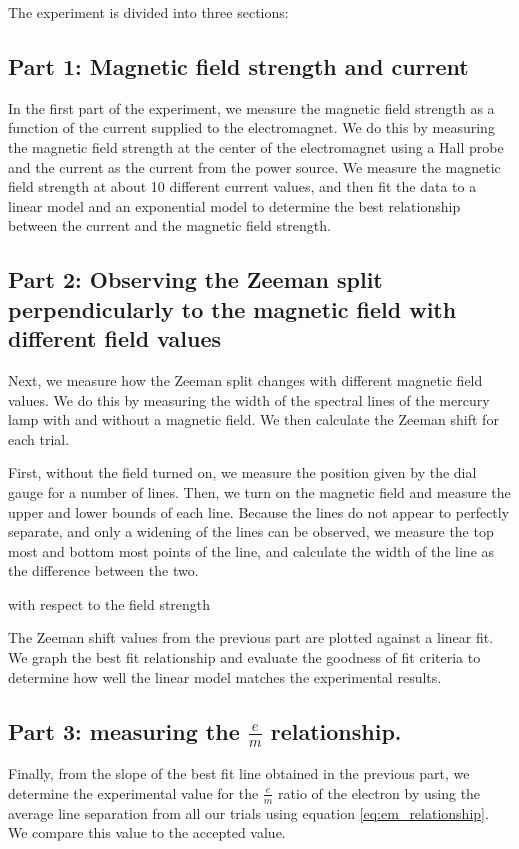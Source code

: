 The experiment is divided into three sections:

\subsection{Part 1: Magnetic field strength and current}
In the first part of the experiment, we measure the magnetic field strength as a function of the current supplied to the electromagnet. We do this by measuring the magnetic field strength at the center of the electromagnet using a Hall probe and the current as the current from the power source. We measure the magnetic field strength at about 10 different current values, and then fit the data to a linear model and an exponential model to determine the best relationship between the current and the magnetic field strength.

\subsection{Part 2: Observing the Zeeman split perpendicularly to the magnetic field with different field values}

Next, we measure how the Zeeman split changes with different magnetic field values.
We do this by measuring the width of the spectral lines of the mercury lamp with and without a magnetic field.
We then calculate the Zeeman shift for each trial.

First, without the field turned on, we measure the position given by the dial gauge for a number of lines.
Then, we turn on the magnetic field and measure the upper and lower bounds of each line. Because
the lines do not appear to perfectly separate, and only a widening of the lines can be observed,
we measure the top most and bottom most points of the line, and calculate the width of the line as the difference between the two.


with respect to the field strength

The Zeeman shift values from the previous part are plotted against a linear fit. We graph the best fit relationship and
evaluate the goodness of fit criteria to determine how well the linear model matches the experimental results.


\subsection{Part 3: measuring the $\frac{e}{m}$ relationship.}

Finally, from the slope of the best fit line obtained in the previous part, we determine the
experimental value for the $\frac{e}{m}$ ratio of the electron by using the average line separation from all our trials using equation \ref{eq:em_relationship}. We compare this value to the accepted value.

